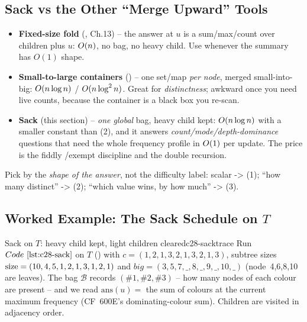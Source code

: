\subsection{Sack vs the Other ``Merge Upward'' Tools}

\begin{comparisonbox}
\begin{itemize}[nosep,leftmargin=1.4em]
  \item \textbf{Fixed-size fold} (, Ch.13) -- the
        answer at \(u\) is a sum/max/count over children plus \(u\): \(O(n)\),
        no bag, no heavy child.  Use whenever the summary has \(O(1)\) shape.
  \item \textbf{Small-to-large containers} () -- one set/map
        \emph{per node}, merged small-into-big: \(O(n\log n)\) /
        \(O(n\log^2 n)\).  Great for \emph{distinctness}; awkward once you
        need live counts, because the container is a black box you re-scan.
  \item \textbf{Sack} (this section) -- \emph{one global} bag, heavy child kept:
        \(O(n\log n)\) with a smaller constant than (2), and it answers
        \emph{count/mode/depth-dominance} questions that need the whole
        frequency profile in \(O(1)\) per update.  The price is the fiddly
        /exempt discipline and the double recursion.
\end{itemize}
Pick by the \emph{shape of the answer}, not the difficulty label: scalar ->
(1); ``how many distinct'' -> (2); ``which value wins, by how much'' -> (3).
\end{comparisonbox}

\subsection{Worked Example: The Sack Schedule on \(T\)}

\begin{example}{Sack on \(T\): heavy child kept, light children cleared}{c28-sacktrace}
Run \(\coderef{c28-sack}\) on \(T\) () with
\(c=(1,2,1,3,2,1,3,2,1,3)\), subtree sizes \(\operatorname{size}=(10,4,5,1,2,1,3,1,2,1)\) and
\(\mathit{big}=(3,5,7,\_,8,\_,9,\_,10,\_)\) (node~4,6,8,10 are leaves).  The bag
\(\mathcal{B}\) records \((\#1,\#2,\#3)\) -- how many nodes of each colour are
present -- and we read \(\mathrm{ans}(u)=\) the sum of colours at the current
maximum frequency (CF~600E's dominating-colour sum).  Children are visited in
adjacency order.
\end{example}

